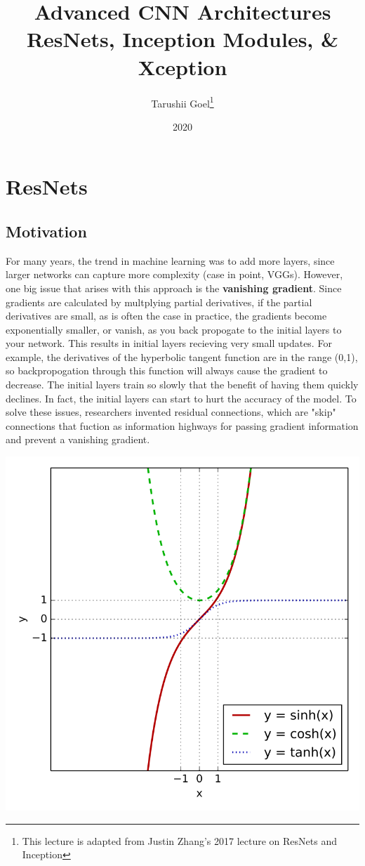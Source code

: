 \documentclass{article}
\title{Advanced CNN Architectures \\ ResNets, Inception Modules, \& Xception}
\author{Tarushii Goel\footnote{This lecture is adapted from Justin Zhang's 2017 lecture on ResNets and Inception}}
\date{2020}
\begin{document}
\maketitle

\section{ResNets}
\subsection{Motivation}
For many years, the trend in machine learning was to add more layers, since larger networks can capture more complexity (case in point, VGGs). However, one big issue that arises with this approach is the {\bf vanishing gradient}. Since gradients are calculated by multplying partial derivatives, if the partial derivatives are small, as is often the case in practice, the gradients become exponentially smaller, or vanish, as you back propogate to the initial layers to your network. This results in initial layers recieving very small updates. For example, the derivatives of the hyperbolic tangent function are in the range (0,1), so backpropogation through this function will always cause the gradient to decrease. The initial layers train so slowly that the benefit of having them quickly declines. In fact, the initial layers can start to hurt the accuracy of the model. To solve these issues, researchers invented residual connections, which are "skip" connections that fuction as information highways for passing gradient information and prevent a vanishing gradient. 
\begin{center}
\includegraphics[scale=0.2]{tanh.png}
\end{center}
\end{document}
